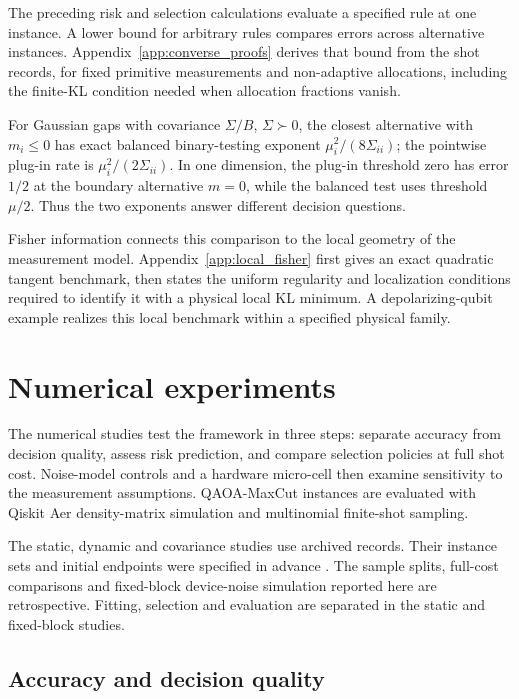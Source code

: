 \documentclass[a4paper,onecolumn,unpublished,nopdfoutputerror]{quantumarticle}
\theoremstyle{plain}
\theoremstyle{definition}
\newcommand{\1}{\mathbf{1}}
\begin{document}
The preceding risk and selection calculations evaluate a specified rule at one instance. A lower bound for arbitrary rules compares errors across alternative instances. Appendix~\ref{app:converse_proofs} derives that bound from the shot records, for fixed primitive measurements and non-adaptive allocations, including the finite-KL condition needed when allocation fractions vanish.

For Gaussian gaps with covariance $\Sigma/B$, $\Sigma\succ0$, the closest alternative with $m_i\le0$ has exact balanced binary-testing exponent $\mu_i^2/(8\Sigma_{ii})$; the pointwise plug-in rate is $\mu_i^2/(2\Sigma_{ii})$. In one dimension, the plug-in threshold zero has error $1/2$ at the boundary alternative $m=0$, while the balanced test uses threshold $\mu/2$. Thus the two exponents answer different decision questions.

Fisher information connects this comparison to the local geometry of the measurement model. Appendix~\ref{app:local_fisher} first gives an exact quadratic tangent benchmark, then states the uniform regularity and localization conditions required to identify it with a physical local KL minimum. A depolarizing-qubit example realizes this local benchmark within a specified physical family.

\section{Numerical experiments}
\label{sec:numerical_proof_of_mechanism}

The numerical studies test the framework in three steps: separate accuracy from decision quality, assess risk prediction, and compare selection policies at full shot cost. Noise-model controls and a hardware micro-cell then examine sensitivity to the measurement assumptions. QAOA-MaxCut instances \cite{Farhi2014} are evaluated with Qiskit Aer density-matrix simulation \cite{Qiskit2024} and multinomial finite-shot sampling.

The static, dynamic and covariance studies use archived records. Their instance sets and initial endpoints were specified in advance \cite{Nosek2018}. The sample splits, full-cost comparisons and fixed-block device-noise simulation reported here are retrospective. Fitting, selection and evaluation are separated in the static and fixed-block studies.

\subsection{Accuracy and decision quality}
\end{document}
